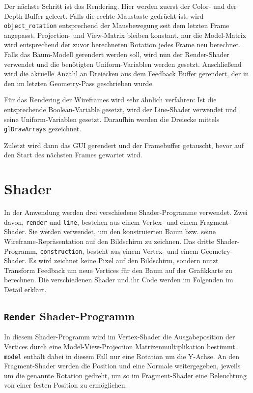 Der nächste Schritt ist das Rendering. Hier werden zuerst der Color- und der Depth-Buffer geleert. Falls die rechte Maustaste gedrückt ist, wird \lstinline{object_rotation} entsprechend der Mausbewegung seit dem letzten Frame angepasst. Projection- und View-Matrix bleiben konstant, nur die Model-Matrix wird entsprechend der zuvor berechneten Rotation jedes Frame neu berechnet. Falls das Baum-Modell gerendert werden soll, wird nun der Render-Shader verwendet und die benötigten Uniform-Variablen werden gesetzt. Anschließend wird die aktuelle Anzahl an Dreiecken aus dem Feedback Buffer gerendert, der in den im letzten Geometry-Pass geschrieben wurde. 

Für das Rendering der Wireframes wird sehr ähnlich verfahren: Ist die entsprechende Boolean-Variable gesetzt, wird der Line-Shader verwendet und seine Uniform-Variablen gesetzt. Daraufhin werden die Dreiecke mittels \lstinline{glDrawArrays} gezeichnet.

Zuletzt wird dann das GUI gerendert und der Framebuffer getauscht, bevor auf den Start des nächsten Frames gewartet wird.



\chapter{Shader}
In der Anwendung werden drei verschiedene Shader-Programme verwendet. Zwei davon, \lstinline{render} und \lstinline{line}, bestehen aus einem Vertex- und einem Fragment-Shader. Sie werden verwendet, um den konstruierten Baum bzw. seine Wireframe-Repräsentation auf den Bildschirm zu zeichnen. Das dritte Shader-Programm, \lstinline{construction}, besteht aus einem Vertex- und einem Geometry-Shader. Es wird zeichnet keine Pixel auf den Bildschirm, sondern nutzt Transform Feedback um neue Vertices für den Baum auf der Grafikkarte zu berechnen. Die verschiedenen Shader und ihr Code werden im Folgenden im Detail erklärt.

\section{\lstinline{Render} Shader-Programm}
In diesem Shader-Programm wird im Vertex-Shader die Ausgabeposition der Vertices durch eine Model-View-Projection Matrizenmultiplikation bestimmt. \lstinline{model} enthält dabei in diesem Fall nur eine Rotation um die Y-Achse. An den Fragment-Shader werden die Position und eine Normale weitergegeben, jeweils um die genannte Rotation gedreht, um so im Fragment-Shader eine Beleuchtung von einer festen Position zu ermöglichen.

